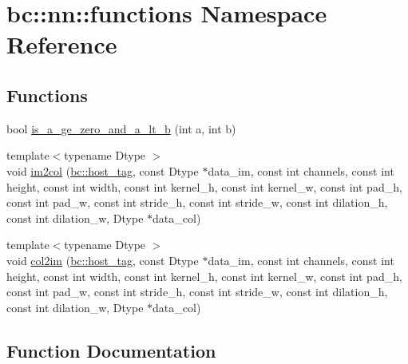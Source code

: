 \hypertarget{namespacebc_1_1nn_1_1functions}{}\section{bc\+:\+:nn\+:\+:functions Namespace Reference}
\label{namespacebc_1_1nn_1_1functions}
\subsection*{Functions}
\begin{DoxyCompactItemize}
\item 
bool \hyperlink{namespacebc_1_1nn_1_1functions_ab4bba863093d317e1b8d22ce21c1b1a5}{is\+\_\+a\+\_\+ge\+\_\+zero\+\_\+and\+\_\+a\+\_\+lt\+\_\+b} (int a, int b)
\item 
{\footnotesize template$<$typename Dtype $>$ }\\void \hyperlink{namespacebc_1_1nn_1_1functions_a954705d9faf8e88f29a8492defbc61e0}{im2col} (\hyperlink{structbc_1_1host__tag}{bc\+::host\+\_\+tag}, const Dtype $\ast$data\+\_\+im, const int channels, const int height, const int width, const int kernel\+\_\+h, const int kernel\+\_\+w, const int pad\+\_\+h, const int pad\+\_\+w, const int stride\+\_\+h, const int stride\+\_\+w, const int dilation\+\_\+h, const int dilation\+\_\+w, Dtype $\ast$data\+\_\+col)
\item 
{\footnotesize template$<$typename Dtype $>$ }\\void \hyperlink{namespacebc_1_1nn_1_1functions_a999a40c3eb04af6395f098db47322b24}{col2im} (\hyperlink{structbc_1_1host__tag}{bc\+::host\+\_\+tag}, const Dtype $\ast$data\+\_\+im, const int channels, const int height, const int width, const int kernel\+\_\+h, const int kernel\+\_\+w, const int pad\+\_\+h, const int pad\+\_\+w, const int stride\+\_\+h, const int stride\+\_\+w, const int dilation\+\_\+h, const int dilation\+\_\+w, Dtype $\ast$data\+\_\+col)
\end{DoxyCompactItemize}


\subsection{Function Documentation}
\mbox{\label{namespacebc_1_1nn_1_1functions_a999a40c3eb04af6395f098db47322b24}} 
